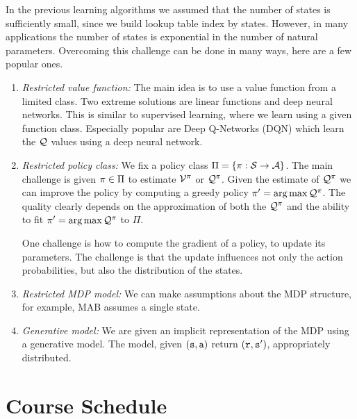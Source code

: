 In the previous learning algorithms we assumed that the number of
states is sufficiently small, since we build lookup table index by
states. However, in many applications the number of states is
exponential in the number of natural parameters. Overcoming this
challenge can be done in many ways, here are a few popular ones.
\begin{enumerate}
\item
{\em Restricted value function:} The main idea is to use a value
function from a limited class. Two extreme solutions are linear
functions and deep neural networks. This is similar to supervised
learning, where we learn using a given function class. Especially
popular are Deep Q-Networks (DQN) which learn the $\mathcal{Q}$ values
using a deep neural network.
\item
{\em Restricted policy class:} We fix a policy class
$\Pi=\{\pi:\mathcal{S}\rightarrow \mathcal{A}\}$. The main challenge is
given $\pi\in \Pi$ to estimate $\mathcal{V}^\pi$ or
$\mathcal{Q}^\pi$. Given the estimate of $\mathcal{Q}^\pi$ we can
improve the policy by computing a greedy policy $\pi'=\arg\max
\mathcal{Q}^\pi$. The quality clearly depends on the approximation
of both the $\mathcal{Q}^\pi$ and the ability to fit
$\pi'=\arg\max \mathcal{Q}^\pi$ to $\Pi$.

One challenge is how to compute the gradient of a policy, to update
its parameters. The challenge is that the update influences not only
the action probabilities, but also the distribution  of the states.
\item
{\em Restricted MDP model:} We can make assumptions about the MDP
structure, for example, MAB assumes a single state.
\item
{\em Generative model:} We are given an implicit representation of
the MDP using a generative model. The model, given
$({\tt s},{\tt a})$ return $({\tt r},{\tt s}')$, appropriately
distributed.
\end{enumerate}

\section{Course Schedule}

